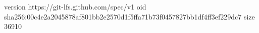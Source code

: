 version https://git-lfs.github.com/spec/v1
oid sha256:00c4e2a2045878af801bb2e2570d1f5ffa71b73f0457827bb1df4ff3ef229dc7
size 36910

